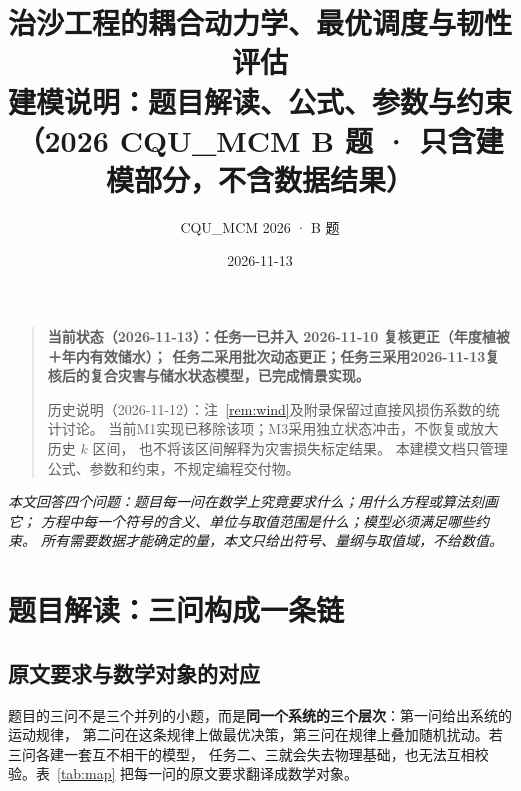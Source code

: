 \documentclass[11pt,a4paper]{ctexart}
\title{\bfseries 治沙工程的耦合动力学、最优调度与韧性评估\\[6pt]
\large 建模说明：题目解读、公式、参数与约束\\[2pt]
\normalsize （2026 CQU\_MCM B 题 · 只含建模部分，不含数据结果）}
\author{CQU\_MCM 2026 · B 题}
\date{2026-11-13}
\begin{document}
\maketitle
\begin{quote}\small\bfseries
当前状态（2026-11-13）：任务一已并入 2026-11-10 复核更正（年度植被＋年内有效储水）；
任务二采用批次动态更正；任务三采用2026-11-13复核后的复合灾害与储水状态模型，已完成情景实现。

历史说明（2026-11-12）：注~\ref{rem:wind}及附录保留过直接风损伤系数的统计讨论。
当前M1实现已移除该项；M3采用独立状态冲击，不恢复或放大历史 $k$ 区间，
也不将该区间解释为灾害损失标定结果。
本建模文档只管理公式、参数和约束，不规定编程交付物。
\end{quote}

\thispagestyle{empty}

\begin{center}
\begin{minipage}{0.88\textwidth}
\small\itshape
本文回答四个问题：题目每一问在数学上究竟要求什么；用什么方程或算法刻画它；
方程中每一个符号的含义、单位与取值范围是什么；模型必须满足哪些约束。
所有需要数据才能确定的量，本文只给出符号、量纲与取值域，不给数值。
\end{minipage}
\end{center}

\vspace{0.6em}
\tableofcontents
\newpage

\section{题目解读：三问构成一条链}

\subsection{原文要求与数学对象的对应}

题目的三问不是三个并列的小题，而是\textbf{同一个系统的三个层次}：第一问给出系统的运动规律，
第二问在这条规律上做最优决策，第三问在规律上叠加随机扰动。若三问各建一套互不相干的模型，
任务二、三就会失去物理基础，也无法互相校验。表~\ref{tab:map} 把每一问的原文要求翻译成数学对象。
\end{document}
